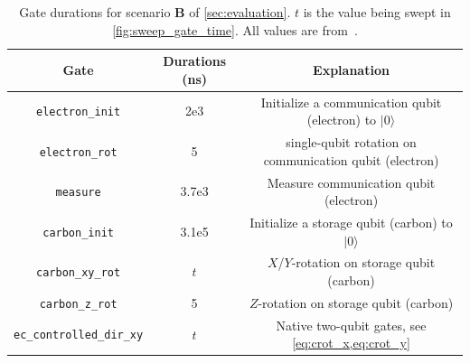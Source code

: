 \begin{table}
  \centering
  \begin{tabular}{|c|c|c|}
    \hline
    Gate                      & Durations (ns) & Explanation                                                \\
    \hline\hline
    \texttt{electron\_init}        & 2e3            & Initialize a communication qubit (electron) to $|0\rangle$ \\
    \texttt{electron\_rot}         & 5              & single-qubit rotation on communication qubit (electron)    \\
    \texttt{measure}              & 3.7e3          & Measure communication qubit (electron)                     \\
    \texttt{carbon\_init}          & 3.1e5          & Initialize a storage qubit (carbon) to $|0\rangle$         \\
    \texttt{carbon\_xy\_rot}        & $t$            & $X$/$Y$-rotation on storage qubit (carbon)                 \\
    \texttt{carbon\_z\_rot}         & 5              & $Z$-rotation on storage qubit (carbon)                     \\
    \texttt{ec\_controlled\_dir\_xy} & $t$            & Native two-qubit gates, see \cref{eq:crot_x,eq:crot_y}     \\
    \hline
  \end{tabular}
  \caption{
    Gate durations for scenario \textbf{B} of \cref{sec:evaluation}.
    $t$ is the value being swept in \cref{fig:sweep_gate_time}.
    All values are from~\cite{dahlberg2019linklayer}.}\label{tab:gates}
\end{table}


